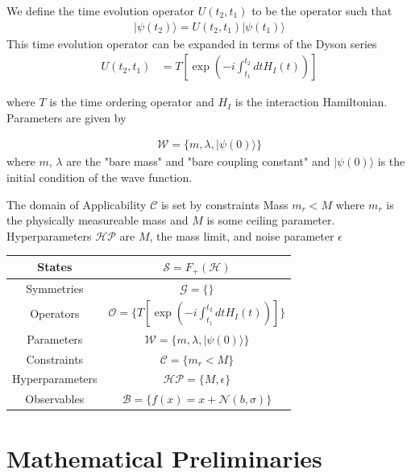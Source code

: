 \documentclass[book.tex]{subfiles}
\begin{document}
We define the time evolution operator $U(t_2, t_1)$ to be the operator such that
\begin{align} | \psi(t_2) \rangle = U(t_2, t_1) |\psi(t_1) \rangle \end{align}
This time evolution operator can be expanded in terms of the Dyson series
\begin{align} 
U(t_2, t_1) &= T\left [ \exp \left ( -i \int_{t_1}^{t_2} dt H_I(t) \right ) \right ]
\end{align}

where $T$ is the time ordering operator and $H_I$ is the interaction Hamiltonian. Parameters are given by

\begin{align}\mathcal{W} = \{m, \lambda, |\psi(0)\rangle \}\end{align}
where $m$, $\lambda$ are the "bare mass" and "bare coupling constant" and $|\psi(0)\rangle$ is the initial condition of the wave function.

The domain of Applicability $\mathcal{C}$ is set by constraints
Mass $m_r < M$ where $m_r$ is the physically measureable mass and $M$ is some ceiling parameter. Hyperparameters $\mathcal{HP}$ are $M$, the mass limit, and noise parameter $\epsilon$


\begin{center}
\begin{tabular}{|c|c|}
    \hline
    States & $\mathcal{S} = F_+(\mathcal{H}) $ \\
    \hline
    Symmetries & $\mathcal{G} = \{\}$\\
    \hline
    Operators & $\mathcal{O} = \{ T \left [ \exp\left ( -i \int_{t_1}^{t_2} dt H_I(t) \right ) \right ]\} $\\
    \hline
    Parameters & $\mathcal{W} = \{m, \lambda, |\psi(0)\rangle \}$ \\
    \hline
    Constraints & $\mathcal{C} =  \{m_r < M\}$ \\
    \hline
    Hyperparameters & $\mathcal{HP} = \{M, \epsilon\}$  \\
    \hline
    Observables & $\mathcal{B} = \{f(x) = x + \mathcal{N}(b, \sigma) \}$  \\
    \hline
\end{tabular}
\label{phs:theory:qft}
\end{center}
\section{Mathematical Preliminaries}
\end{document}
